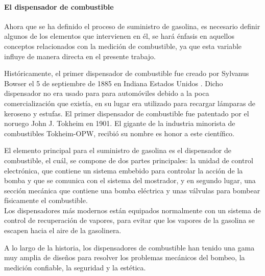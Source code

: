 \paragraph{El dispensador de combustible}
Ahora que se ha definido el proceso de suministro de gasolina, es necesario definir algunos de los elementos que intervienen en él, se hará énfasis en aquellos conceptos relacionados con la medición de combustible, ya que esta variable influye de manera directa en el presente trabajo.

Históricamente, el primer dispensador de combustible fue creado por Sylvanus Bowser el 5 de septiembre de 1885 en Indiana Estados Unidos \citep{MarcoTeorico4}. Dicho dispensador no era usado para para automóviles debido a la poca comercialización que existía, en su lugar era utilizado para recargar lámparas de keroseno y estufas. El primer dispensador de combustible fue patentado por el noruego John J. Tokheim en 1901. El gigante de la industria minorista de combustibles Tokheim-OPW, recibió su nombre es honor a este científico. \citep{MarcoTeorico4}

El elemento principal para el suministro de gasolina es el dispensador de combustible, el cuál, se compone de dos partes principales: la unidad de control electrónica, que contiene un sistema embebido para controlar la acción de la bomba y que se comunica con el sistema del mostrador, y en segundo lugar, una sección mecánica que contiene una bomba eléctrica y unas válvulas para bombear físicamente el combustible. 
\\Los dispensadores más modernos están equipados normalmente con un sistema de control de recuperación de vapores, para evitar que los vapores de la gasolina se escapen hacia el aire de la gasolinera.

A lo largo de la historia, los dispensadores de combustible han tenido una gama muy amplia de diseños para resolver los problemas mecánicos del bombeo, la medición confiable, la seguridad y la estética.\\\\

